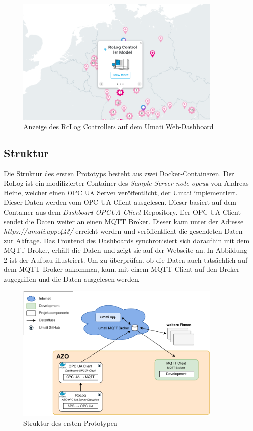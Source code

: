 \documentclass[a4paper, 12pt, oneside, toc=listofnumbered, bibliography=totoc]{scrbook}
\begin{document}
		\begin{figure}[H]
			\centering
			\includegraphics[width=0.9\textwidth]{res/UmatiApp.png}
			\caption{Anzeige des RoLog Controllers auf dem Umati Web-Dashboard}
			\label{fig:umatiApp}
		\end{figure}
		
		\subsection{Struktur}
		
		Die Struktur des ersten Prototyps besteht aus zwei Docker-Containeren. Der RoLog ist ein modifizierter Container des \textit{Sample-Server-node-opcua} von Andreas Heine, welcher einen OPC UA Server veröffentlicht, der Umati implementiert. Dieser Daten werden vom OPC UA Client ausgelesen. Dieser basiert auf dem Container aus dem \textit{Dashboard-OPCUA-Client} Repository. Der OPC UA Client sendet die Daten weiter an einen MQTT Broker. Dieser kann unter der Adresse \textit{https://umati.app:443/} erreicht werden und veröffentlicht die gesendeten Daten zur Abfrage. Das Frontend des Dashboards synchronisiert sich daraufhin mit dem MQTT Broker, erhält die Daten und zeigt sie auf der Webseite an. In Abbildung \ref{fig:Prototyp1} ist der Aufbau illustriert. Um zu überprüfen, ob die Daten auch tatsächlich auf dem MQTT Broker ankommen, kann mit einem MQTT Client auf den Broker zugegriffen und die Daten ausgelesen werden.
		
		\begin{figure}[H]
			\centering
			\includegraphics[width=0.9\textwidth]{res/implementierung/Prototyp-umatiWeb.pdf}
			\caption{Struktur des ersten Prototypen}
			\label{fig:Prototyp1}
		\end{figure}
		
\end{document}
